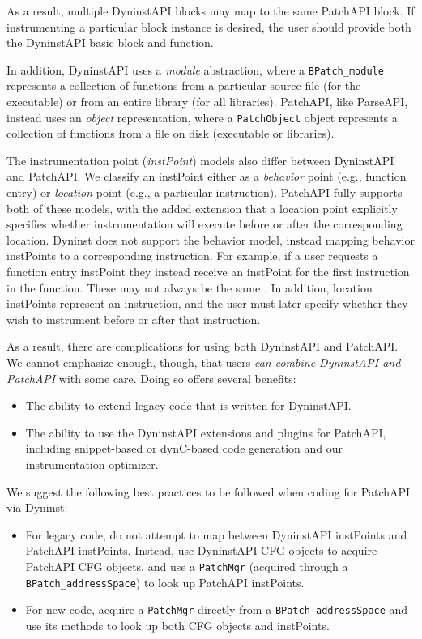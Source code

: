 As a result, multiple DyninstAPI blocks may map to the same PatchAPI
block. If instrumenting a particular block instance is desired, the
user should provide both the DyninstAPI basic block and function. 

In addition, DyninstAPI uses a \emph{module} abstraction, where
a \texttt{BPatch\_module} represents a collection of functions from a
particular source file (for the executable) or from an entire library
(for all libraries). PatchAPI, like ParseAPI, instead uses
an \emph{object} representation, where a \texttt{PatchObject} object
represents a collection of functions from a file on disk (executable
or libraries). 

The instrumentation point (\emph{instPoint}) models also differ
between DyninstAPI and PatchAPI. We classify an instPoint either as
a \emph{behavior} point (e.g., function entry) or \emph{location}
point (e.g., a particular instruction). PatchAPI fully supports both
of these models, with the added extension that a location point
explicitly specifies whether instrumentation will execute before or
after the corresponding location. Dyninst does not support the
behavior model, instead mapping behavior instPoints to a corresponding
instruction. For example, if a user requests a function entry
instPoint they instead receive an instPoint for the first instruction
in the function. These may not always be the
same \cite{Bernat-AWAT}. In addition, location instPoints represent an
instruction, and the user must later specify whether they wish to
instrument before or after that instruction.

As a result, there are complications for using both DyninstAPI and
PatchAPI. We cannot emphasize enough, though, that users \emph{can
combine DyninstAPI and PatchAPI} with some care. Doing so offers
several benefits:
\begin{itemize}
\item The ability to extend legacy code that is written for
DyninstAPI. 
\item The ability to use the DyninstAPI extensions and plugins for
PatchAPI, including snippet-based or dynC-based code generation and
our instrumentation optimizer. 
\end{itemize}
We suggest the following best practices to be followed when coding for
PatchAPI via Dyninst:
\begin{itemize}
\item For legacy code, do not attempt to map between DyninstAPI
instPoints and PatchAPI instPoints. Instead, use DyninstAPI CFG
objects to acquire PatchAPI CFG objects, and use a \texttt{PatchMgr} (acquired
through a \texttt{BPatch\_addressSpace}) to look up
PatchAPI instPoints. 
\item For new code, acquire a \texttt{PatchMgr} directly from
a \texttt{BPatch\_addressSpace} and use its methods to look up both
CFG objects and instPoints. 
\end{itemize}

